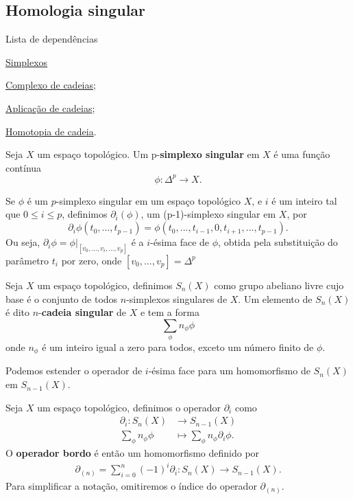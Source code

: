 \subsection{Homologia singular} %
\label{homologia-singular-def}
\begin{titlemize}{Lista de dependências}
    \item \hyperref[simplexo-def]{Simplexos}
	\item \hyperref[complexo-de-cadeias-def]{Complexo de cadeias};\\ 
    \item \hyperref[aplicacao-de-cadeias-def]{Aplicação de cadeias};\\
    \item \hyperref[homotopia-de-cadeias-def]{Homotopia de cadeia}.\\
\end{titlemize}

\begin{defi}
    Seja $X$ um espaço topológico. Um p-\textbf{simplexo singular} em $X$ é uma função contínua 
    \[\phi:\Delta^p\longrightarrow X.\]
\end{defi}

\begin{defi}
    Se $\phi$ é um $p$-simplexo singular em um espaço topológico $X$, e $i$ é um inteiro tal que $0\le i\le p$, definimos $\partial_i (\phi)$, um (p-1)-simplexo singular em $X$, por 
    \[\partial_i \phi(t_0,...,t_{p-1})=\phi(t_0,...,t_{i-1},0,t_{i+1},...,t_{p-1}).\]
    Ou seja, $\partial_i \phi=\phi|_{[v_0,...,\widehat{v_i},...,v_{p}]}$ é a $i$-ésima face de $\phi$, obtida pela substituição do parâmetro $t_i$ por zero, onde $[v_0,...,v_p]=\Delta^p$
\end{defi}

\begin{defi}
    Seja $X$ um espaço topológico, definimos $S_n(X)$ como grupo abeliano livre cujo base é o conjunto de todos $n$-simplexos singulares de $X$. Um elemento de $S_n(X)$ é dito $n$-\textbf{cadeia singular} de $X$ e tem a forma 
    \[\sum_\phi n_\phi \phi\]
    onde $n_\phi$ é um inteiro igual a zero para todos, exceto um número finito de $\phi$.
\end{defi}

Podemos estender o operador de $i$-ésima face para um homomorfismo de $S_n(X)$ em $S_{n-1} (X)$. 

\begin{defi}
    Seja $X$ um espaço topológico, definimos o operador $\partial_i$ como
    \begin{align*}
        \partial_i: S_n(X)&\longrightarrow S_{n-1}(X)\\
        \sum_\phi n_\phi \phi&\longmapsto \sum_\phi n_\phi \partial_i\phi.
    \end{align*}
    O \textbf{operador bordo} é então um homomorfismo definido por
    \begin{align*}
        \partial_{(n)}=\sum_{i=0}^n (-1)^i \partial_i:S_n(X)\longrightarrow S_{n-1}(X).
    \end{align*}
    Para simplificar a notação, omitiremos o índice do operador $\partial_{(n)}$.
\end{defi}

